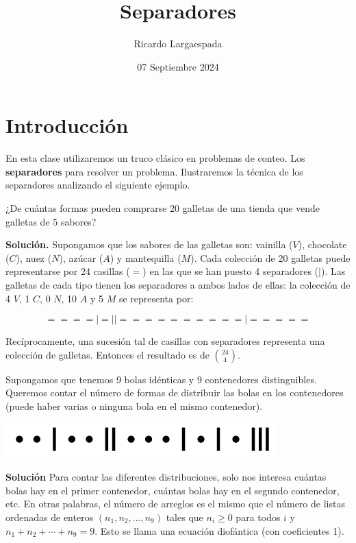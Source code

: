 \documentclass[11pt]{scrartcl}
\begin{document}
\title{Separadores}
\author{Ricardo Largaespada}
\date{07 Septiembre 2024}

\maketitle

\section{Introducción}

En esta clase utilizaremos un truco clásico en problemas de conteo. Los \textbf{separadores} para resolver un problema. Ilustraremos la técnica de los separadores analizando el siguiente ejemplo.

\begin{example}
¿De cuántas formas pueden comprarse 20 galletas de una tienda que vende galletas de 5 sabores?
\end{example}
\textbf{Solución.} Supongamos que los sabores de las galletas son: vainilla (\(V\)), chocolate (\(C\)), nuez (\(N\)), azúcar (\(A\)) y mantequilla (\(M\)). Cada colección de 20 galletas puede representarse por 24 casillas (\(=\)) en las que se han puesto 4 separadores (\(|\)). Las galletas de cada tipo tienen los separadores a ambos lados de ellas:  la colección de 4 \(V\), 1 \(C\), 0 \(N\), 10 \(A\) y 5 \(M\) se representa por:

\[
= = = = | = | | = = = = = = = = = = | = = = = =
\]

Recíprocamente, una sucesión tal de casillas con separadores representa una colección de galletas. Entonces el resultado es de \(\binom{24}{4}\).

\begin{example} 
Supongamos que tenemos 9 bolas idénticas y 9 contenedores distinguibles. Queremos contar el número de formas de distribuir las bolas en los contenedores (puede haber varias o ninguna bola en el mismo contenedor).
\end{example}
\begin{center}
    \includegraphics[scale=1]{images/clase_17_separadores.png}
\end{center}
\textbf{Solución} Para contar las diferentes distribuciones, solo nos interesa cuántas bolas hay en el primer contenedor, cuántas bolas hay en el segundo contenedor, etc. En otras palabras, el número de arreglos es el mismo que el número de listas ordenadas de enteros $(n_1, n_2, \dots, n_9)$ tales que $n_i \geq 0$ para todos $i$ y $n_1 + n_2 + \cdots + n_9 = 9$. Esto se llama una ecuación diofántica (con coeficientes 1).\\
\end{document}
